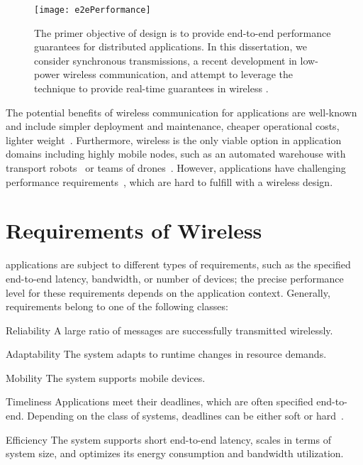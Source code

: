 \begin{figure}
  \centering
  \texttt{[image: e2ePerformance]}
  \caption{The primer objective of \CPS design is to provide end-to-end performance guarantees for distributed applications.
	{In this dissertation, we consider synchronous transmissions, a recent development in low-power wireless communication, and attempt to leverage the technique to provide real-time guarantees in wireless \CPS.}}
  \label{fig:e2ePerf}
\end{figure}

The potential benefits of wireless communication for \CPS applications are well-known and include \eg simpler deployment and maintenance, cheaper operational costs, lighter weight~\cite{luvisotto2017Ultra}.
Furthermore, wireless is the only viable option in application domains including highly mobile nodes, such as an automated warehouse with transport robots~\cite{haegele2018Logistics} or teams of drones~\cite{mottola2014Teamlevela}.
However, \CPS applications have challenging performance requirements~\cite{akerberg2011Future}, which are hard to fulfill with a wireless design.


\section{Requirements of Wireless \CPS}

\CPS applications are subject to different types of requirements, such as the specified end-to-end latency, bandwidth, or number of devices; the precise performance level for these requirements depends on the application context.
Generally, \CPS requirements belong to one of the following classes:

\begin{features}[labelwidth=65pt, leftmargin=(\labelwidth+\labelsep)]

  \item[Reliability]
  A large ratio of messages are successfully transmitted wirelessly.

  \item[Adaptability]
  The system adapts to runtime changes in resource demands.

	\item[Mobility]
  The system supports mobile devices.

	\item[Timeliness]
  Applications meet their deadlines, which are often specified end-to-end. Depending on the class of systems, deadlines can be either soft or hard~\cite{buttazzo2011HardRT}.

  \item[Efficiency]
  The system
  supports short end-to-end latency,
  scales in terms of system size,
  and
  optimizes its energy consumption and bandwidth utilization.

\end{features}

